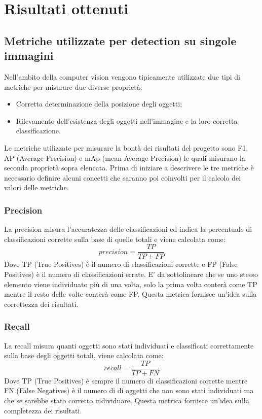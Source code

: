 \section{Risultati ottenuti}
\subsection{Metriche utilizzate per detection su singole immagini}
Nell'ambito della computer vision vengono tipicamente utilizzate due tipi di metriche per misurare due diverse proprietà:
\begin{itemize}
\item Corretta determinazione della posizione degli oggetti;
\item Rilevamento dell'esistenza degli oggetti nell'immagine e la loro corretta classificazione.
\end{itemize}
Le metriche utilizzate per misurare la bontà dei risultati del progetto sono F1, AP (Average Precision) e mAp (mean Average Precision) le quali misurano la seconda proprietà sopra elencata.
Prima di iniziare a descrivere le tre metriche è necessario definire alcuni concetti che saranno poi coinvolti per il calcolo dei valori delle metriche.
\subsubsection{Precision}
La precision misura l'accuratezza delle classificazioni ed indica la percentuale di classificazioni corrette sulla base di quelle totali e viene calcolata come:
\[
    precision = \frac{TP}{TP + FP}
\]
Dove TP (True Positives) è il numero di classificazioni corrette e FP (False Positives) è il numero di classificazioni errate. E' da sottolineare che se uno stesso elemento viene individuato più di una volta, solo la prima volta conterà come TP mentre il resto delle volte conterà come FP. Questa metrica fornisce un'idea sulla correttezza dei risultati.
\subsubsection{Recall}
La recall misura quanti oggetti sono stati individuati e classificati correttamente sulla base degli oggetti totali, viene calcolata come:
\[
    recall = \frac{TP}{TP + FN}
\]
Dove TP (True Positives) è sempre il numero di classificazioni corrette mentre FN (False Negatives) è il numero di di oggetti che non sono stati individuati ma che se sarebbe stato corretto individuare. Questa metrica fornisce un'idea sulla completezza dei risultati.
